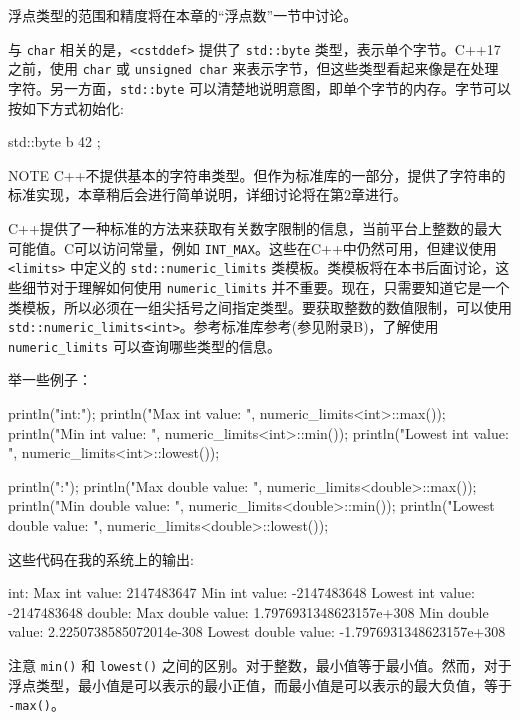 浮点类型的范围和精度将在本章的“浮点数”一节中讨论。

与 \verb|char| 相关的是，\verb|<cstddef>| 提供了 \verb|std::byte| 类型，表示单个字节。C++17之前，使用 \verb|char| 或 \verb|unsigned char| 来表示字节，但这些类型看起来像是在处理字符。另一方面，\verb|std::byte| 可以清楚地说明意图，即单个字节的内存。字节可以按如下方式初始化:

\begin{cpp}
std::byte b { 42 };
\end{cpp}

\begin{myNotic}{NOTE}
C++不提供基本的字符串类型。但作为标准库的一部分，提供了字符串的标准实现，本章稍后会进行简单说明，详细讨论将在第2章进行。
\end{myNotic}


C++提供了一种标准的方法来获取有关数字限制的信息，当前平台上整数的最大可能值。C可以访问常量，例如 \verb|INT_MAX|。这些在C++中仍然可用，但建议使用 \verb|<limits>| 中定义的 \verb|std::numeric_limits| 类模板。类模板将在本书后面讨论，这些细节对于理解如何使用 \verb|numeric_limits| 并不重要。现在，只需要知道它是一个类模板，所以必须在一组尖括号之间指定类型。要获取整数的数值限制，可以使用 \verb|std::numeric_limits<int>|。参考标准库参考(参见附录B)，了解使用 \verb|numeric_limits| 可以查询哪些类型的信息。

举一些例子：

\begin{cpp}
println("int:");
println("Max int value: {}", numeric_limits<int>::max());
println("Min int value: {}", numeric_limits<int>::min());
println("Lowest int value: {}", numeric_limits<int>::lowest());

println("\ndouble:");
println("Max double value: {}", numeric_limits<double>::max());
println("Min double value: {}", numeric_limits<double>::min());
println("Lowest double value: {}", numeric_limits<double>::lowest());
\end{cpp}

这些代码在我的系统上的输出:

\begin{shell}
int:
Max int value: 2147483647
Min int value: -2147483648
Lowest int value: -2147483648
double:
Max double value: 1.7976931348623157e+308
Min double value: 2.2250738585072014e-308
Lowest double value: -1.7976931348623157e+308
\end{shell}

注意 \verb|min()| 和 \verb|lowest()| 之间的区别。对于整数，最小值等于最小值。然而，对于浮点类型，最小值是可以表示的最小正值，而最小值是可以表示的最大负值，等于 \verb|-max()|。

